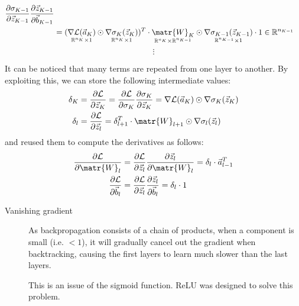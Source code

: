 \begin{description}
\[\begin{split}
                    \frac{\partial\sigma_{K-1}}{\partial\vec{z}_{K-1}} \frac{\partial\vec{z}_{K-1}}{\partial\vec{b}_{K-1}} \\
                    &= (
                            \underset{\mathbb{R}^{n_K} \times 1}{\nabla\mathcal{L}(\vec{a}_K)} \odot 
                            \underset{\mathbb{R}^{n_K} \times 1}{\nabla\sigma_K(\vec{z}_K)} 
                        )^T \cdot 
                        \underset{\mathbb{R}^{n_K} \times \mathbb{R}^{n_{K-1}}}{\matr{W}_K} \odot
                        \underset{\mathbb{R}^{n_{K-1}} \times 1}{\nabla\sigma_{K-1}(\vec{z}_{K-1})} \cdot 
                        1
                \in \mathbb{R}^{n_{K-1}}
            \end{split}
        \]
        \[ \vdots \]

    It can be noticed that many terms are repeated from one layer to another.
    By exploiting this, we can store the following intermediate values:
    \[  
        \begin{split}
            \delta_K &= \frac{\partial\mathcal{L}}{\partial\vec{z}_K} = \frac{\partial\mathcal{L}}{\partial\sigma_K} \frac{\partial\sigma_K}{\partial\vec{z}_K} =
                \nabla\mathcal{L}(\vec{a}_K) \odot \nabla\sigma_K(\vec{z}_K) \\
            \delta_l &= \frac{\partial\mathcal{L}}{\partial\vec{z}_l} = \delta_{l+1}^T \cdot \matr{W}_{l+1} \odot \nabla\sigma_l(\vec{z}_l)
        \end{split}
    \]
    and reused them to compute the derivatives as follows:
    \[
        \begin{split}
            \frac{\partial\mathcal{L}}{\partial\matr{W}_l} &= \frac{\partial\mathcal{L}}{\partial\vec{z}_l}\frac{\partial\vec{z}_l}{\partial\matr{W}_l} =
                \delta_l \cdot \vec{a}_{l-1}^T \\
            \frac{\partial\mathcal{L}}{\partial\vec{b}_l} &= \frac{\partial\mathcal{L}}{\partial\vec{z}_l}\frac{\partial\vec{z}_l}{\partial\vec{b}_l} =
                \delta_l \cdot 1
        \end{split}  
    \]
\end{description}


\begin{description}
    \item[Vanishing gradient] 
        As backpropagation consists of a chain of products, 
        when a component is small (i.e. $< 1$), it will gradually cancel out the gradient when backtracking, 
        causing the first layers to learn much slower than the last layers.

        \begin{remark}
            This is an issue of the sigmoid function.
            ReLU was designed to solve this problem.
        \end{remark}
\end{description}